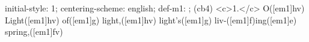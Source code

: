 initial-style: 1;
centering-scheme: english;
def-m1: \grealign;
(cb4) <c>1.</c> O([em1]hv) Light([em1]hv) of([em1]g) light,([em1]hv) light's([em1]g) liv-([em1]f)ing([em1]e) spring,([em1]fv)